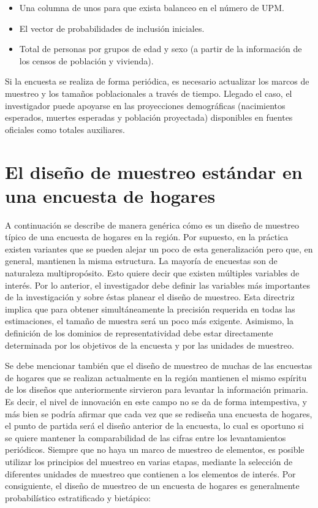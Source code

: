 \documentclass[
  12pt,
  spanish,
]{book}
\providecommand{\tightlist}{%
  \setlength{\itemsep}{0pt}\setlength{\parskip}{0pt}}
\begin{document}
\begin{itemize}
\tightlist
\item
  Una columna de unos para que exista balanceo en el número de UPM.
\item
  El vector de probabilidades de inclusión iniciales.
\item
  Total de personas por grupos de edad y sexo (a partir de la información de los censos de población y vivienda).
\end{itemize}

Si la encuesta se realiza de forma periódica, es necesario actualizar los marcos de muestreo y los tamaños poblacionales a través de tiempo. Llegado el caso, el investigador puede apoyarse en las proyecciones demográficas (nacimientos esperados, muertes esperadas y población proyectada) disponibles en fuentes oficiales como totales auxiliares.

\hypertarget{el-diseuxf1o-de-muestreo-estuxe1ndar-en-una-encuesta-de-hogares}{%
\section{El diseño de muestreo estándar en una encuesta de hogares}\label{el-diseuxf1o-de-muestreo-estuxe1ndar-en-una-encuesta-de-hogares}}

A continuación se describe de manera genérica cómo es un diseño de muestreo típico de una encuesta de hogares en la región. Por supuesto, en la práctica existen variantes que se pueden alejar un poco de esta generalización pero que, en general, mantienen la misma estructura. La mayoría de encuestas son de naturaleza multipropósito. Esto quiere decir que existen múltiples variables de interés. Por lo anterior, el investigador debe definir las variables más importantes de la investigación y sobre éstas planear el diseño de muestreo. Esta directriz implica que para obtener simultáneamente la precisión requerida en todas las estimaciones, el tamaño de muestra será un poco más exigente. Asimismo, la definición de los dominios de representatividad debe estar directamente determinada por los objetivos de la encuesta y por las unidades de muestreo.

Se debe mencionar también que el diseño de muestreo de muchas de las encuestas de hogares que se realizan actualmente en la región mantienen el mismo espíritu de los diseños que anteriormente sirvieron para levantar la información primaria. Es decir, el nivel de innovación en este campo no se da de forma intempestiva, y más bien se podría afirmar que cada vez que se rediseña una encuesta de hogares, el punto de partida será el diseño anterior de la encuesta, lo cual es oportuno si se quiere mantener la comparabilidad de las cifras entre los levantamientos periódicos. Siempre que no haya un marco de muestreo de elementos, es posible utilizar los principios del muestreo en varias etapas, mediante la selección de diferentes unidades de muestreo que contienen a los elementos de interés. Por consiguiente, el diseño de muestreo de un encuesta de hogares es generalmente probabilístico estratificado y bietápico:
\end{document}
